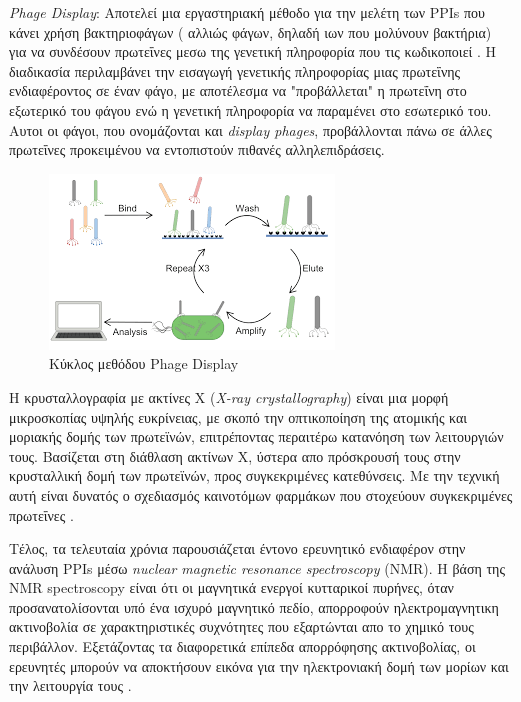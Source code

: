 \newpage
\textit{Phage Display}: Αποτελεί μια εργαστηριακή μέθοδο για την μελέτη των PPIs που κάνει χρήση βακτηριοφάγων ( αλλιώς φάγων, δηλαδή ιων που μολύνουν βακτήρια) για να συνδέσουν πρωτεΐνες μεσω της γενετική πληροφορία που τις κωδικοποιεί \cite{Smith1985}. Η διαδικασία περιλαμβάνει την εισαγωγή γενετικής πληροφορίας μιας πρωτεΐνης ενδιαφέροντος σε έναν φάγο, με αποτέλεσμα να "προβάλλεται" η πρωτεΐνη στο εξωτερικό του φάγου ενώ η γενετική πληροφορία να παραμένει στο εσωτερικό του. Αυτοι οι φάγοι, που ονομάζονται και \textit{display phages}, προβάλλονται πάνω σε άλλες πρωτεΐνες προκειμένου να εντοπιστούν πιθανές αλληλεπιδράσεις.

\begin{figure}[h]
  \centering
  \includegraphics[scale=0.8]{images/phagedisplay.png}
  \caption{Κύκλος μεθόδου Phage Display}
  \label{fig:phagedisplay}
\end{figure}

H κρυσταλλογραφία με ακτίνες Χ (\textit{X-ray crystallography}) είναι μια μορφή μικροσκοπίας υψηλής ευκρίνειας, με σκοπό την οπτικοποίηση της ατομικής και μοριακής δομής των πρωτεϊνών, επιτρέποντας περαιτέρω κατανόηση των λειτουργιών τους. Βασίζεται στη διάθλαση ακτίνων Χ, ύστερα απο πρόσκρουσή τους στην κρυσταλλική δομή των πρωτεϊνών, προς συγκεκριμένες κατεθύνσεις. Με την τεχνική αυτή είναι δυνατός ο σχεδιασμός καινοτόμων φαρμάκων που στοχεύουν συγκεκριμένες πρωτεΐνες \cite{Tong2001}.

Τέλος, τα τελευταία χρόνια παρουσιάζεται έντονο ερευνητικό ενδιαφέρον στην ανάλυση PPIs μέσω \textit{nuclear magnetic resonance spectroscopy} (NMR). Η βάση της NMR spectroscopy είναι ότι οι μαγνητικά ενεργοί κυτταρικοί πυρήνες, όταν προσανατολίσονται υπό ένα ισχυρό μαγνητικό πεδίο, απορροφούν ηλεκτρομαγνητικη ακτινοβολία σε χαρακτηριστικές συχνότητες που εξαρτώνται απο το χημικό τους περιβάλλον. Εξετάζοντας τα διαφορετικά επίπεδα απορρόφησης ακτινοβολίας, οι ερευνητές μπορούν να αποκτήσουν εικόνα για την ηλεκτρονιακή δομή των μορίων και την λειτουργία τους \cite{OConnell2009}.


